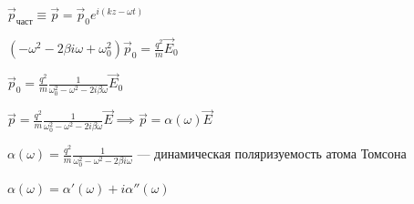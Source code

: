 $\vec{p}_{\text{част}} \equiv \vec{p} = \vec{p}_0 e^{i(kz - \omega t)}$

$(-\omega^2 - 2\beta i\omega + \omega_0^2) \vec{p}_0 = \frac{q^2}{m} \vec{E}_0$

$\vec{p}_0 = \frac{q^2}{m} \frac{1}{\omega_0^2 - \omega^2 - 2i\beta\omega} \vec{E}_0$

$\vec{p} = \frac{q^2}{m} \frac{1}{\omega_0^2 - \omega^2 - 2i\beta\omega} \vec{E} \implies \vec{p} = \alpha(\omega) \vec{E}$

\begin{nb}
	$\alpha(\omega) = \frac{q^2}{m} \frac{1}{\omega_0^2 - \omega^2 - 2\beta i\omega}$ --- динамическая поляризуемость атома Томсона
	
	$\alpha(\omega) = \alpha'(\omega) + i\alpha''(\omega)$
\end{nb}
